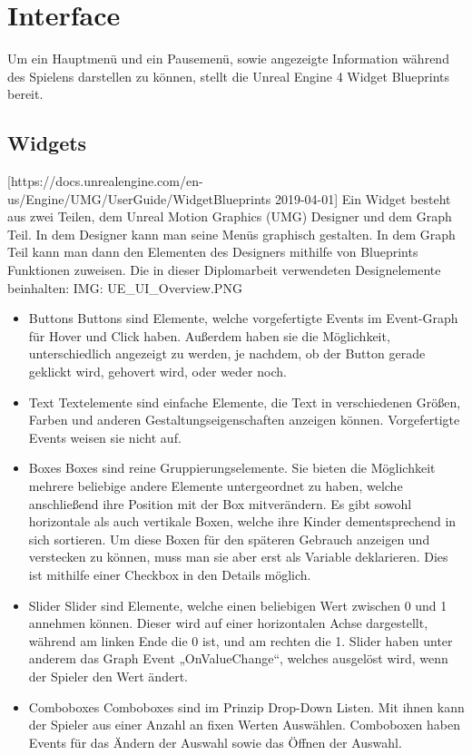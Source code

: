 \section{Interface}
Um ein Hauptmenü und ein Pausemenü, sowie angezeigte Information während des Spielens darstellen zu können, stellt die Unreal Engine 4 Widget Blueprints bereit.
\subsection{Widgets} [https://docs.unrealengine.com/en-us/Engine/UMG/UserGuide/WidgetBlueprints 2019-04-01]
Ein Widget besteht aus zwei Teilen, dem Unreal Motion Graphics (UMG) Designer und dem Graph Teil.
In dem Designer kann man seine Menüs graphisch gestalten.
In dem Graph Teil kann man dann den Elementen des Designers mithilfe von Blueprints Funktionen zuweisen.
Die in dieser Diplomarbeit verwendeten Designelemente beinhalten:
{IMG: UE_UI_Overview.PNG}
\begin{itemize}
    \item Buttons
    Buttons sind Elemente, welche vorgefertigte Events im Event-Graph für Hover und Click haben.
    Außerdem haben sie die Möglichkeit, unterschiedlich angezeigt zu werden, je nachdem, ob der Button gerade geklickt wird, gehovert wird, oder weder noch.
    \item Text
    Textelemente sind einfache Elemente, die Text in verschiedenen Größen, Farben und anderen Gestaltungseigenschaften anzeigen können.
    Vorgefertigte Events weisen sie nicht auf.
    \item Boxes
    Boxes sind reine Gruppierungselemente.
    Sie bieten die Möglichkeit mehrere beliebige andere Elemente untergeordnet zu haben, welche anschließend ihre Position mit der Box mitverändern.
    Es gibt sowohl horizontale als auch vertikale Boxen, welche ihre Kinder dementsprechend in sich sortieren.
    Um diese Boxen für den späteren Gebrauch anzeigen und verstecken zu können, muss man sie aber erst als Variable deklarieren.
    Dies ist mithilfe einer Checkbox in den Details möglich.
    \item Slider
    Slider sind Elemente, welche einen beliebigen Wert zwischen 0 und 1 annehmen können.
    Dieser wird auf einer horizontalen Achse dargestellt, während am linken Ende die 0 ist, und am rechten die 1.
    Slider haben unter anderem das Graph Event „OnValueChange“, welches ausgelöst wird, wenn der Spieler den Wert ändert.
    \item Comboboxes
    Comboboxes sind im Prinzip Drop-Down Listen.
    Mit ihnen kann der Spieler aus einer Anzahl an fixen Werten Auswählen.
    Comboboxen haben Events für das Ändern der Auswahl sowie das Öffnen der Auswahl.
\end{itemize}

